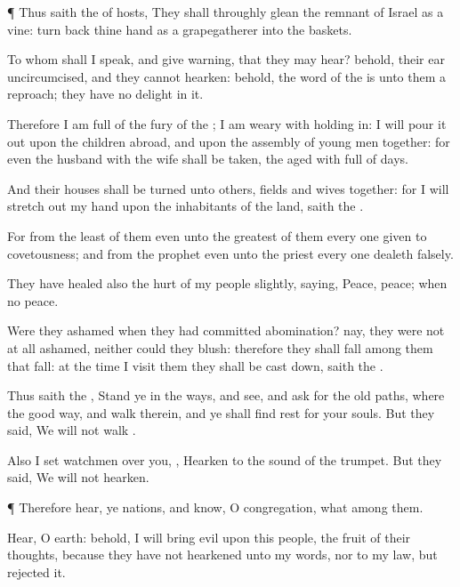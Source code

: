 {\par }{\PP {}¶ Thus
saith the
{} of
hosts, They shall
throughly
glean the
remnant of
Israel as a
vine: turn
back thine
hand as a
grapegatherer into the
baskets.

To whom shall I
speak, and give
warning, that they may
hear? behold, their
ear
{}
uncircumcised, and they
cannot
hearken: behold, the
word of the
{} is unto them a
reproach; they have no
delight in it.

Therefore I am
full of the
fury of the
{}; I am
weary with holding
in: I will pour it
out upon the
children
abroad, and upon the
assembly of young
men
together: for even the
husband with the
wife shall be
taken, the
aged with
{}
full of
days.

And their
houses shall be
turned unto
others,
{}
fields and
wives
together: for I will stretch
out my
hand upon the
inhabitants of the
land,
saith the
{}.

For from the
least of them even unto the
greatest of them every one
{}
given to
covetousness; and from the
prophet even unto the
priest every one
dealeth
falsely.

They have
healed also the
hurt
{} of my
people
slightly,
saying,
Peace,
peace; when
{} no
peace.

Were they
ashamed when they had
committed
abomination?
nay, they were not at
all
ashamed,
neither
could they
blush: therefore they shall
fall among them that
fall: at the
time
{} I
visit them they shall be cast
down,
saith the
{}.

Thus
saith the
{},
Stand ye in the
ways, and
see, and
ask for the
old
paths, where
{} the
good
way, and
walk therein, and ye shall
find
rest for your
souls. But they
said, We will not
walk
{}.

Also I
set
watchmen over you,
{},
Hearken to the
sound of the
trumpet. But they
said, We will not
hearken.


\par }{\PP {}¶ Therefore
hear, ye
nations, and
know, O
congregation, what
{} among them.

Hear, O
earth: behold, I will
bring
evil upon this
people,
{} the
fruit of their
thoughts, because they have not
hearkened unto my
words, nor to my
law, but
rejected it.

}

